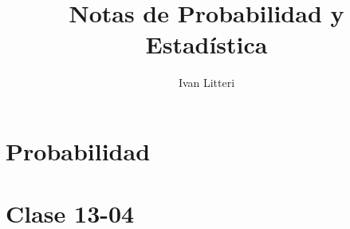 \documentclass[hidelinks]{article}
\title{Notas de Probabilidad y Estadística}
\author{Ivan Litteri}
\date{}
\begin{document}
\maketitle
\tableofcontents
\clearpage

\section{Probabilidad}

\clearpage

\section{Clase 13-04}

\clearpage

\printindex
\end{document}
